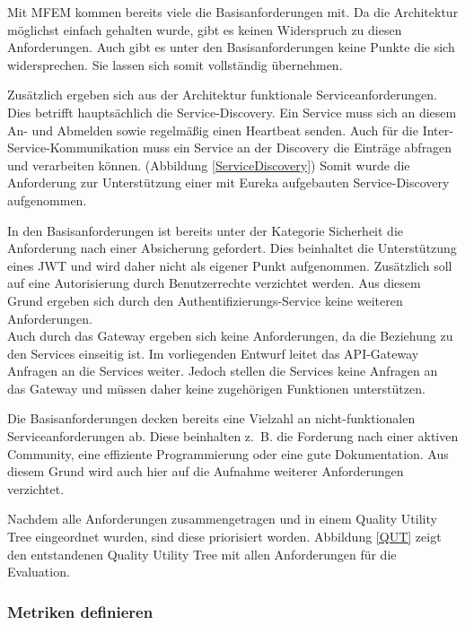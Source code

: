 Mit \ac{MFEM} kommen bereits viele die Basisanforderungen mit. Da die Architektur möglichst einfach gehalten wurde, gibt es keinen Widerspruch zu diesen Anforderungen. Auch gibt es unter den Basisanforderungen keine Punkte die sich widersprechen. Sie lassen sich somit vollständig übernehmen.

Zusätzlich ergeben sich aus der Architektur funktionale Serviceanforderungen. Dies betrifft hauptsächlich die Service-Discovery. Ein Service muss sich an diesem An- und Abmelden sowie regelmäßig einen Heartbeat senden. Auch für die Inter-Service-Kommunikation muss ein Service an der Discovery die Einträge abfragen und verarbeiten können. (Abbildung \ref{ServiceDiscovery}) Somit wurde die Anforderung zur Unterstützung einer mit Eureka aufgebauten Service-Discovery aufgenommen.

In den Basisanforderungen ist bereits unter der Kategorie Sicherheit die Anforderung nach einer Absicherung gefordert. Dies beinhaltet die Unterstützung eines \ac{JWT} und wird daher nicht als eigener Punkt aufgenommen. Zusätzlich soll auf eine Autorisierung durch Benutzerrechte verzichtet werden. 
Aus diesem Grund ergeben sich durch den Authentifizierungs-Service keine weiteren Anforderungen.\\
Auch durch das Gateway ergeben sich keine Anforderungen, da die Beziehung zu den Services einseitig ist. Im vorliegenden Entwurf leitet das API-Gateway Anfragen an die Services weiter. Jedoch stellen die Services keine Anfragen an das Gateway und müssen daher keine zugehörigen Funktionen unterstützen.

Die Basisanforderungen decken bereits eine Vielzahl an nicht-funktionalen Serviceanforderungen ab. Diese beinhalten z.~B. die Forderung nach einer aktiven Community, eine effiziente Programmierung oder eine gute Dokumentation. Aus diesem Grund wird auch hier auf die Aufnahme weiterer Anforderungen verzichtet.

Nachdem alle Anforderungen zusammengetragen und in einem Quality Utility Tree eingeordnet wurden, sind diese priorisiert worden. Abbildung \ref{QUT} zeigt den entstandenen Quality Utility Tree mit allen Anforderungen für die Evaluation.


\subsubsection{Metriken definieren}

